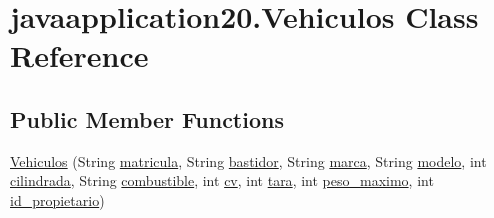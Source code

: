 \hypertarget{classjavaapplication20_1_1_vehiculos}{}\section{javaapplication20.\+Vehiculos Class Reference}
\label{classjavaapplication20_1_1_vehiculos}
\subsection*{Public Member Functions}
\begin{DoxyCompactItemize}
\item 
\mbox{\hyperlink{classjavaapplication20_1_1_vehiculos_aed8aafbb495080709c827223e587a033}{Vehiculos}} (String \mbox{\hyperlink{classjavaapplication20_1_1_vehiculos_a00ca322d3efc66517f045c58a6858a73}{matricula}}, String \mbox{\hyperlink{classjavaapplication20_1_1_vehiculos_a8e57e42476235c0fb54d5480a4b033be}{bastidor}}, String \mbox{\hyperlink{classjavaapplication20_1_1_vehiculos_af8b537d237bd309fd6ebc5e5bd7b4469}{marca}}, String \mbox{\hyperlink{classjavaapplication20_1_1_vehiculos_a717312899a8efa6bee16a81248a85b0d}{modelo}}, int \mbox{\hyperlink{classjavaapplication20_1_1_vehiculos_ac28bed25c6d436eaf88519b8d646b7a9}{cilindrada}}, String \mbox{\hyperlink{classjavaapplication20_1_1_vehiculos_ad7c53867ff5e447d79eb96ddc307b40e}{combustible}}, int \mbox{\hyperlink{classjavaapplication20_1_1_vehiculos_a9cdd64c9b7db2fa65f174783082d7a9e}{cv}}, int \mbox{\hyperlink{classjavaapplication20_1_1_vehiculos_aae0e84c500242de0732b52eb6a941174}{tara}}, int \mbox{\hyperlink{classjavaapplication20_1_1_vehiculos_a36a9aa2b170d9892bddd74c5e0447f00}{peso\+\_\+maximo}}, int \mbox{\hyperlink{classjavaapplication20_1_1_vehiculos_a41dcb7765d0f936dc45ca9c13e3cf2f9}{id\+\_\+propietario}})
\end{DoxyCompactItemize}
